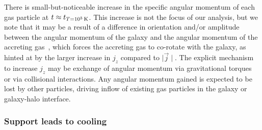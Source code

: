 \documentclass[fleqn,usenatbib]{mnras}
\newcommand{\Rcon}{R_{T=10^5\,{\rm K}}}
\newcommand{\tcon}{t_{T=10^5\,{\rm K}}}
\begin{document}
There is small-but-noticeable increase in the specific angular momentum of each gas particle at $t \approx \tcon$.
This increase is not the focus of our analysis, but we note that it may be a result of a difference in orientation and/or amplitude between the angular momentum of the galaxy and the angular momentum of the accreting gas~\citep[e.g.][]{Danovich2012, DeFelippis2017, DeFelippis2020}, which forces the accreting gas to co-rotate with the galaxy, as hinted at by the larger increase in $j_z$ compared to $\mid \vec j \mid$.
The explicit mechanism to increase $j_z$ may be exchange of angular momentum via gravitational torques~\citep[e.g.][]{Danovich2015} or via collisional interactions.
Any angular momentum gained is expected to be lost by other particles, driving inflow of existing gas particles in the galaxy or galaxy-halo interface.



\subsubsection{Support leads to cooling}
\label{s: mechanics -- energy balance}
\end{document}
